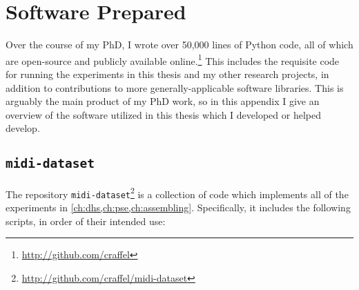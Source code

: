 \chapter{Software Prepared}
\label{ch:software}

Over the course of my PhD, I wrote over 50,000 lines of Python code, all of which are open-source and publicly available online.\footnote{\url{http://github.com/craffel}}
This includes the requisite code for running the experiments in this thesis and my other research projects, in addition to contributions to more generally-applicable software libraries.
This is arguably the main product of my PhD work, so in this appendix I give an overview of the software utilized in this thesis which I developed or helped develop.

\section{\texttt{midi-dataset}}

The repository \texttt{midi-dataset}\footnote{\url{http://github.com/craffel/midi-dataset}} is a collection of code which implements all of the experiments in \cref{ch:dhs,ch:pse,ch:assembling}.
Specifically, it includes the following scripts, in order of their intended use:

